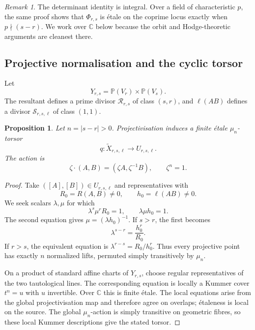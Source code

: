 \documentclass[11pt,reqno]{amsart}
\newtheorem{proposition}[proposition]{Proposition}
\theoremstyle{definition}
\theoremstyle{remark}
\newtheorem{remark}[remark]{Remark}
\newcommand{\Pj}{\mathbb P}
\newcommand{\C}{\mathbb C}
\newcommand{\cR}{\mathcal R}
\newcommand{\cS}{\mathcal S}
\newcommand{\abs}[1]{\lvert #1\rvert}
\begin{document}
\begin{remark}\label{rem:characteristic}
The determinant identity is integral.  Over a field of characteristic
$p$, the same proof shows that $\Phi_{r,s}$ is étale on the coprime locus
exactly when $p\nmid(s-r)$.  We work over $\C$ below because the orbit and
Hodge-theoretic arguments are cleanest there.
\end{remark}

\subsection{Projective normalisation and the cyclic torsor}

Let
\[
 Y_{r,s}=\Pj(V_r)\times\Pj(V_s).
\]
The resultant defines a prime divisor $\cR_{r,s}$ of class $(s,r)$, and
$\ell(AB)$ defines a divisor $\cS_{r,s,\ell}$ of class $(1,1)$.

\begin{proposition}\label{prop:torsor}
Let $n=\abs{s-r}>0$.  Projectivisation induces a finite étale
$\mu_n$-torsor
\[
 q:\widetilde X_{r,s,\ell}\longrightarrow U_{r,s,\ell}.
\]
The action is
\[
 \zeta\cdot(A,B)=(\zeta A,\zeta^{-1}B),
 \qquad \zeta^n=1.
\]
\end{proposition}

\begin{proof}
Take $([A],[B])\in U_{r,s,\ell}$ and representatives with
\[
 R_0=R(A,B)\ne0,
 \qquad h_0=\ell(AB)\ne0.
\]
We seek scalars $\lambda,\mu$ for which
\[
 \lambda^s\mu^rR_0=1,
 \qquad \lambda\mu h_0=1.
\]
The second equation gives $\mu=(\lambda h_0)^{-1}$.  If $s>r$, the
first becomes
\begin{equation}\label{eq:kummer-local}
 \lambda^{s-r}=\frac{h_0^r}{R_0}.
\end{equation}
If $r>s$, the equivalent equation is
$\lambda^{r-s}=R_0/h_0^r$.  Thus every projective point has exactly $n$
normalized lifts, permuted simply transitively by $\mu_n$.

On a product of standard affine charts of $Y_{r,s}$, choose regular
representatives of the two tautological lines.  The corresponding equation
is locally a Kummer cover $t^n=u$ with $u$ invertible.  Over $\C$ this
is finite étale.  The local equations arise from the global
projectivisation map and therefore agree on overlaps; étaleness is
local on the source.  The global $\mu_n$-action is simply transitive on
geometric fibres, so these local Kummer descriptions give the stated
torsor.
\end{proof}
\end{document}
